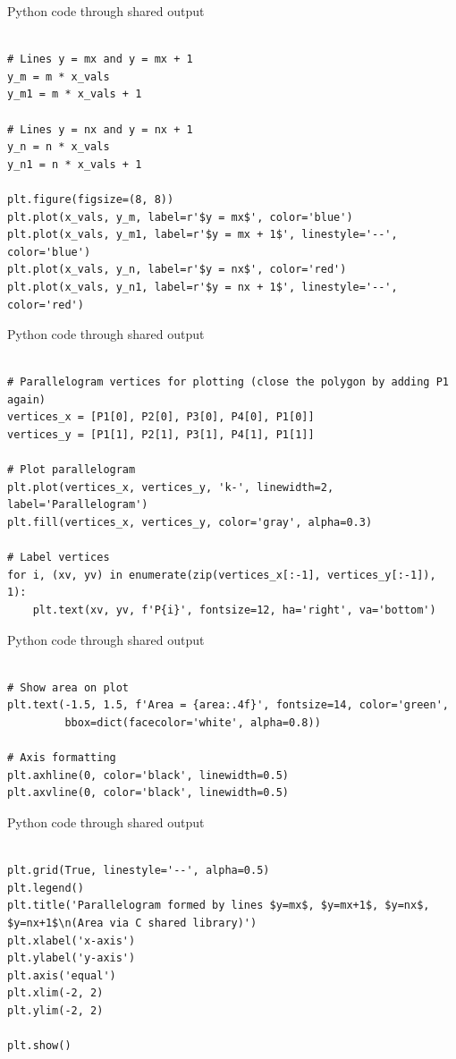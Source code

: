 \documentclass{beamer}
\begin{document}
\begin{frame}[fragile]{Python code through shared output}
\begin{lstlisting}

# Lines y = mx and y = mx + 1
y_m = m * x_vals
y_m1 = m * x_vals + 1

# Lines y = nx and y = nx + 1
y_n = n * x_vals
y_n1 = n * x_vals + 1

plt.figure(figsize=(8, 8))
plt.plot(x_vals, y_m, label=r'$y = mx$', color='blue')
plt.plot(x_vals, y_m1, label=r'$y = mx + 1$', linestyle='--', color='blue')
plt.plot(x_vals, y_n, label=r'$y = nx$', color='red')
plt.plot(x_vals, y_n1, label=r'$y = nx + 1$', linestyle='--', color='red')
 \end{lstlisting}
\end{frame}
\begin{frame}[fragile]{Python code through shared output}
\begin{lstlisting}

# Parallelogram vertices for plotting (close the polygon by adding P1 again)
vertices_x = [P1[0], P2[0], P3[0], P4[0], P1[0]]
vertices_y = [P1[1], P2[1], P3[1], P4[1], P1[1]]

# Plot parallelogram
plt.plot(vertices_x, vertices_y, 'k-', linewidth=2, label='Parallelogram')
plt.fill(vertices_x, vertices_y, color='gray', alpha=0.3)

# Label vertices
for i, (xv, yv) in enumerate(zip(vertices_x[:-1], vertices_y[:-1]), 1):
    plt.text(xv, yv, f'P{i}', fontsize=12, ha='right', va='bottom')
 \end{lstlisting}
\end{frame}
\begin{frame}[fragile]{Python code through shared output}
\begin{lstlisting}

# Show area on plot
plt.text(-1.5, 1.5, f'Area = {area:.4f}', fontsize=14, color='green',
         bbox=dict(facecolor='white', alpha=0.8))

# Axis formatting
plt.axhline(0, color='black', linewidth=0.5)
plt.axvline(0, color='black', linewidth=0.5)
 \end{lstlisting}
\end{frame}
\begin{frame}[fragile]{Python code through shared output}
\begin{lstlisting}

plt.grid(True, linestyle='--', alpha=0.5)
plt.legend()
plt.title('Parallelogram formed by lines $y=mx$, $y=mx+1$, $y=nx$, $y=nx+1$\n(Area via C shared library)')
plt.xlabel('x-axis')
plt.ylabel('y-axis')
plt.axis('equal')
plt.xlim(-2, 2)
plt.ylim(-2, 2)

plt.show()

 \end{lstlisting}
 \end{frame}
\end{document}
